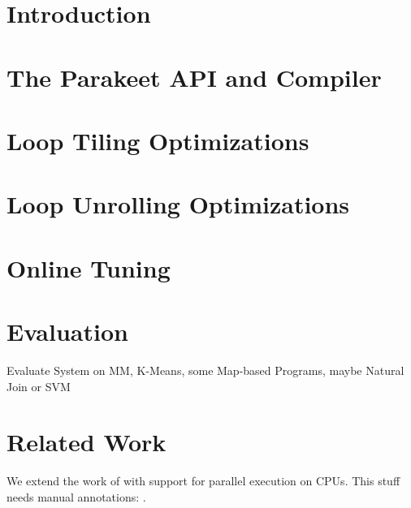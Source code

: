 \documentclass[preprint,9pt]{sigplanconf}
\begin{document}



\section{Introduction}


\section{The Parakeet API and Compiler}

\section{Loop Tiling Optimizations}

\section{Loop Unrolling Optimizations}

\section{Online Tuning}

\section{Evaluation}
Evaluate System on MM, K-Means, some Map-based Programs, maybe Natural Join or SVM

\section{Related Work}
We extend the work of \cite{Rubi12} with support for parallel execution on CPUs.
This stuff needs manual annotations: \cite{Tiwa11}.






{}




\end{document}
